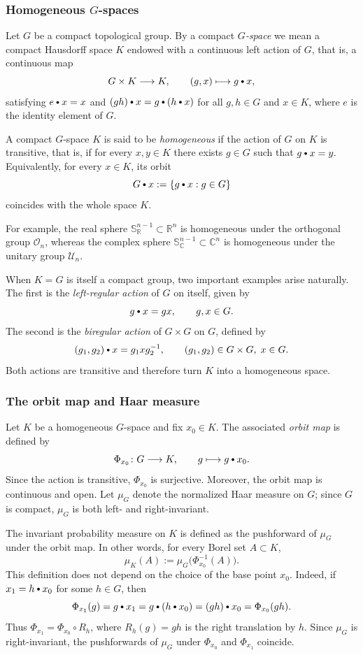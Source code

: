 \documentclass[11pt,showkeys]{amsart}
\newcommand{\hbullet}{\mathbin{\vcenter{\hbox{\scalebox{0.7}{$\bullet$}}}}}
\begin{document}
\subsubsection{Homogeneous $G$-spaces}


Let $G$ be a compact topological group. By a compact \emph{$G$-space} we mean a
compact  Hausdorff space $K$ endowed with a continuous left action of $G$,
that is, a continuous map
$$
G\times K\longrightarrow K,\qquad (g,x)\longmapsto g\hbullet x,
$$
satisfying $e\hbullet x=x$ and $(gh)\hbullet x=g\hbullet(h\hbullet x)$ for all
$g,h\in G$ and $x\in K$, where $e$ is the identity element of $G$.


A compact $G$-space $K$ is said to be \emph{homogeneous} if the action of $G$
on $K$ is transitive, that is, if for every $x,y\in K$ there exists $g\in G$
such that
$g\hbullet x=y.$
Equivalently, for every $x\in K$, its orbit
$$
G\hbullet x:=\{g\hbullet x:g\in G\}
$$
coincides with the whole space $K$.

  For example, the real sphere
$\mathbb S_{\mathbb R}^{n-1}\subset\mathbb R^n$ is homogeneous under the orthogonal group
$\mathcal O_n$, whereas the complex sphere
$\mathbb S_{\mathbb C}^{n-1}\subset\mathbb C^n$ is homogeneous under the unitary group
$\mathcal U_n$.



When $K=G$ is itself a compact group, two important examples arise naturally. The first is the \emph{left-regular action} of $G$ on itself, given by
$$
g\hbullet x=gx,\qquad g, x\in G.
$$
The second is the \emph{biregular action} of $G\times G$ on $G$, defined by
$$
(g_1,g_2)\hbullet x=g_1xg_2^{-1},\qquad (g_1,g_2) \in G \times G ,\; x\in G.
$$
Both actions are transitive and therefore turn $K$ into a homogeneous space.

\subsubsection{The orbit map and Haar measure}
Let \(K\) be a homogeneous \(G\)-space and fix \(x_0\in K\). The associated
\emph{orbit map} is defined by
\[
        \Phi_{x_0}\colon G\longrightarrow K,
        \qquad
        g\longmapsto g\hbullet x_0 .
\]
Since the action is transitive, \(\Phi_{x_0}\) is surjective. Moreover, the
orbit map is continuous and open. Let \(\mu_G\) denote the normalized Haar
measure on \(G\); since \(G\) is compact, \(\mu_G\) is both left- and
right-invariant.

The invariant probability measure on \(K\) is defined as the pushforward
of \(\mu_G\) under the orbit map. In other words, for every Borel set
\(A\subset K\),
\[
        \mu_K(A):=\mu_G\bigl(\Phi_{x_0}^{-1}(A)\bigr).
\]
This definition does not depend on the choice of the base point $x_0$. Indeed,
if $x_1=h\hbullet x_0$ for some $h\in G$, then
\[
        \Phi_{x_1}(g)=g\hbullet x_1=g\hbullet(h\hbullet x_0)=(gh)\hbullet x_0
        =\Phi_{x_0}(gh).
\]
Thus $\Phi_{x_1}=\Phi_{x_0}\circ R_h$, where $R_h(g)=gh$ is the right translation
by $h$. Since $\mu_G$ is right-invariant, the pushforwards of $\mu_G$ under
$\Phi_{x_0}$ and $\Phi_{x_1}$ coincide.
\end{document}
